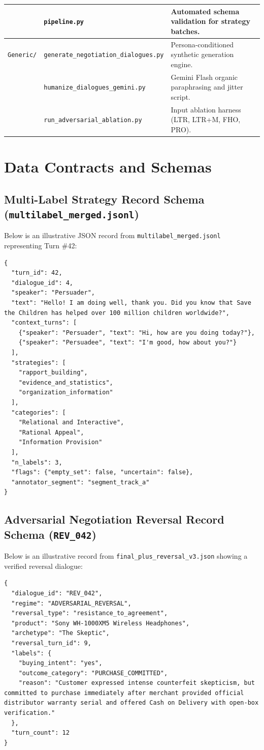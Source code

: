 \begin{table}[htbp]
\begin{tabularx}{\textwidth}{lp{}Y}
    & \texttt{pipeline.py} & Automated schema validation for strategy batches. \\
    \midrule
    \texttt{Generic/} & \texttt{generate\_negotiation\_dialogues.py} & Persona-conditioned synthetic generation engine. \\
    & \texttt{humanize\_dialogues\_gemini.py} & Gemini Flash organic paraphrasing and jitter script. \\
    & \texttt{run\_adversarial\_ablation.py} & Input ablation harness (LTR, LTR+M, FHO, PRO). \\
    \bottomrule
  \end{tabularx}
\end{table}

\clearpage
\chapter{Data Contracts and Schemas}
\label{app:schemas}

\section*{Multi-Label Strategy Record Schema (\texttt{multilabel\_merged.jsonl})}
Below is an illustrative JSON record from \texttt{multilabel\_merged.jsonl} representing Turn \#42:
\begin{lstlisting}
{
  "turn_id": 42,
  "dialogue_id": 4,
  "speaker": "Persuader",
  "text": "Hello! I am doing well, thank you. Did you know that Save the Children has helped over 100 million children worldwide?",
  "context_turns": [
    {"speaker": "Persuader", "text": "Hi, how are you doing today?"},
    {"speaker": "Persuadee", "text": "I'm good, how about you?"}
  ],
  "strategies": [
    "rapport_building",
    "evidence_and_statistics",
    "organization_information"
  ],
  "categories": [
    "Relational and Interactive",
    "Rational Appeal",
    "Information Provision"
  ],
  "n_labels": 3,
  "flags": {"empty_set": false, "uncertain": false},
  "annotator_segment": "segment_track_a"
}
\end{lstlisting}

\section*{Adversarial Negotiation Reversal Record Schema (\texttt{REV\_042})}
Below is an illustrative record from \texttt{final\_plus\_reversal\_v3.json} showing a verified reversal dialogue:
\begin{lstlisting}
{
  "dialogue_id": "REV_042",
  "regime": "ADVERSARIAL_REVERSAL",
  "reversal_type": "resistance_to_agreement",
  "product": "Sony WH-1000XM5 Wireless Headphones",
  "archetype": "The Skeptic",
  "reversal_turn_id": 9,
  "labels": {
    "buying_intent": "yes",
    "outcome_category": "PURCHASE_COMMITTED",
    "reason": "Customer expressed intense counterfeit skepticism, but committed to purchase immediately after merchant provided official distributor warranty serial and offered Cash on Delivery with open-box verification."
  },
  "turn_count": 12
}
\end{lstlisting}

